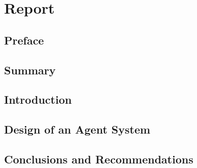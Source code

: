 \part{Report}

\chapter*{Preface}

\chapter*{Summary}

\chapter{Introduction}





\chapter{Design of an Agent System}

\chapter{Conclusions and Recommendations}